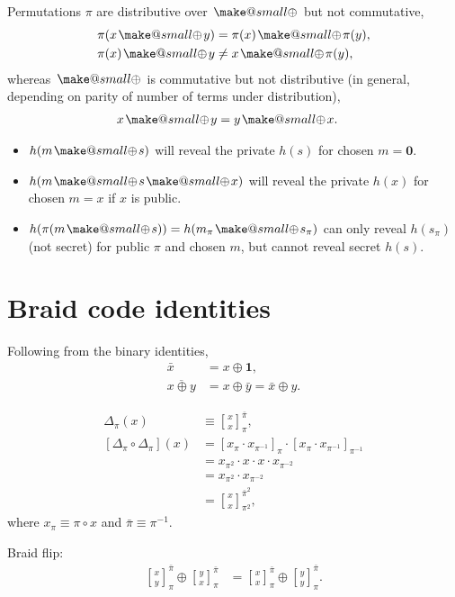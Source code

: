 \documentclass[twocolumn, aps, amsmath, amssymb, nofootinbib, superscriptaddress, longbibliography, doublefloatfix, table-of-contents, eqsecnum, rmp]{revtex4-2}
\makeatletter
\def\onevec{\mathbf{1}}
\newcommand{\stackbraid}[2]{{\genfrac{[}{]}{0pt}{}{{#1}}{{#2}}}^{\bar{\pi}}_{\pi}}
\newcommand{\stackbraidpow}[3]{{\genfrac{[}{]}{0pt}{}{{#1}}{{#2}}}^{\bar{\pi}^{#3}}_{\pi^#3}}
\newcommand{\soplus}{{{\hspace{1pt}}{\mathbin{\mathpalette\make@small{\mathbin\oplus}}}}{\hspace{1pt}}}
\newcommand{\make@small}[2]{%
  \vcenter{\hbox{%
    \scalebox{0.6}{$\m@th#1#2$}%
  }}%
}
\makeatother
\begin{document}
Permutations $\pi$ are distributive over $\soplus$ but not commutative,
\begin{align}
	\pi(x\soplus y) &= \pi(x) \soplus \pi(y),\nonumber\\
	\pi(x) \soplus y &\neq x \soplus \pi(y),
\end{align}
whereas $\soplus$ is commutative but not distributive (in general, depending on parity of number of terms under distribution),
\begin{align}
	x\soplus y &= y \soplus x.
\end{align}

\begin{itemize}
	\item $h(m\soplus s)$ will reveal the private $h(s)$ for chosen $m=\mathbf{0}$.
	\item $h(m\soplus s \soplus x)$ will reveal the private $h(x)$ for chosen $m=x$ if $x$ is public.
	\item $h(\pi(m\soplus s)) = h(m_\pi \soplus s_\pi)$ can only reveal $h(s_\pi)$ (not secret) for public $\pi$ and chosen $m$, but cannot reveal secret $h(s)$.
\end{itemize}

\section{Braid code identities}

Following from the binary identities,
\begin{align}
	\bar{x} &= x \oplus \onevec,\nonumber\\
	\overline{x\oplus y} &= x \oplus \bar{y} = \bar{x} \oplus y.
\end{align}

\begin{align}
	\Delta_\pi(x) &\equiv \stackbraid{x}{x},\nonumber\\
	[\Delta_\pi \circ\Delta_\pi](x) &= [x_\pi \cdot x_{\pi^{-1}}]_\pi \cdot [x_\pi \cdot x_{\pi^{-1}}]_{\pi^{-1}} \nonumber\\
	&= x_{\pi^{2}} \cdot x \cdot x \cdot x_{\pi^{-2}} \nonumber\\
	&= x_{\pi^{2}} \cdot x_{\pi^{-2}} \nonumber\\
	&= \stackbraidpow{x}{x}{2},
\end{align}
where $x_\pi \equiv \pi \circ x$ and $\bar{\pi}\equiv \pi^{-1}$.

Braid flip:
\begin{align}
	\stackbraid{x}{y} \oplus \stackbraid{y}{x} &= \stackbraid{x}{x} \oplus \stackbraid{y}{y}.
\end{align}
\end{document}
